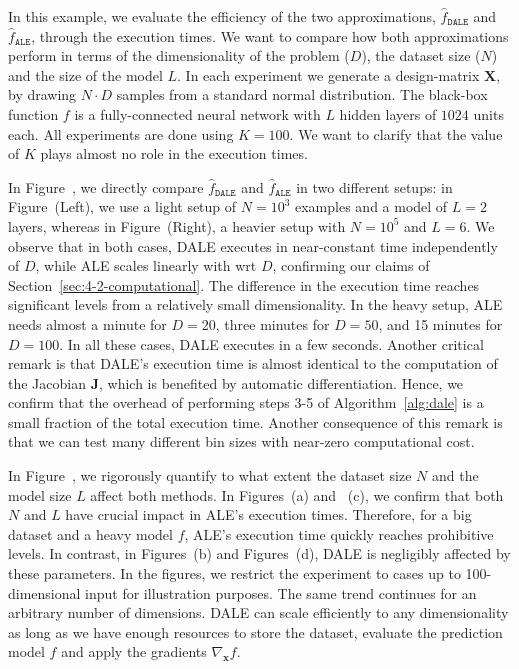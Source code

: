 \documentclass[wcp]{jmlr}
\newcommand{\dale}{\hat{f}_{\mathtt{DALE}}}
\newcommand{\xb}{\mathbf{x}}
\newcommand{\Jac}{\mathbf{J}}
\begin{document}
In this example, we evaluate the efficiency of the two approximations,
\(\dale\) and \(\hat{f}_{\mathtt{ALE}}\), through the
execution times. We want to compare how both approximations perform in
terms of the dimensionality of the problem (\(D\)), the dataset size
(\(N\)) and the size of the model \(L\). In each experiment we
generate a design-matrix \( \mathbf{X} \), by drawing \( N \cdot D \)
samples from a standard normal distribution. The black-box function
\(f \) is a fully-connected neural network with \(L\) hidden layers of
\( 1024 \) units each. All experiments are done using \(K=100\). We
want to clarify that the value of \(K\) plays almost no role in the
execution times.

In Figure~, we directly compare
\(\dale\) and \(\hat{f}_{\mathtt{ALE}}\) in two different
setups: in Figure~(Left), we use a light setup
of \(N=10^3\) examples and a model of \(L=2\) layers, whereas in
Figure~(Right), a heavier setup with
\(N=10^5\) and \(L=6\). We observe that in both cases, DALE executes
in near-constant time independently of \(D\), while ALE scales
linearly with wrt \(D\), confirming our claims of
Section~\ref{sec:4-2-computational}. The difference in the execution
time reaches significant levels from a relatively small
dimensionality. In the heavy setup, ALE needs almost a minute for
\(D=20\), three minutes for \(D=50\), and 15 minutes for \(D=100\). In
all these cases, DALE executes in a few seconds. Another critical
remark is that DALE's execution time is almost identical to the
computation of the Jacobian \( \Jac \), which is benefited by
automatic differentiation. Hence, we confirm that the overhead of
performing steps 3-5 of Algorithm~\ref{alg:dale} is a small fraction
of the total execution time. Another consequence of this remark is
that we can test many different bin sizes with near-zero computational
cost.

In Figure~, we rigorously quantify to what
extent the dataset size \(N\) and the model size \(L\) affect both
methods. In Figures~(a) and
~(c), we confirm that both \(N\) and \(L\)
have crucial impact in ALE's execution times. Therefore, for a big
dataset and a heavy model \(f\), ALE's execution time quickly reaches
prohibitive levels. In contrast, in
Figures~(b) and
Figures~(d), DALE is negligibly affected by
these parameters. In the figures, we restrict the experiment to cases
up to 100-dimensional input for illustration purposes. The same trend
continues for an arbitrary number of dimensions. DALE can scale
efficiently to any dimensionality as long as we have enough resources
to store the dataset, evaluate the prediction model \(f\) and apply
the gradients \(\nabla_{\xb}f\).
\end{document}
